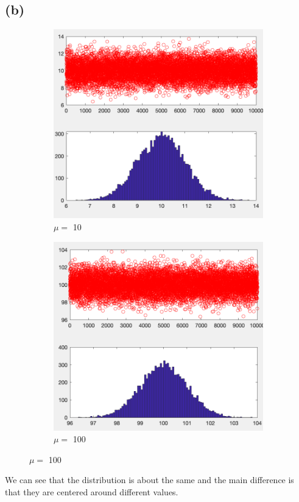 \documentclass{article}
\begin{document}
\subsection{(b)}
\begin{figure}[H]
    \begin{subfigure}[h]{0.4\linewidth}
        \includegraphics[width=\linewidth]{./imgs/q1b_10.png}
        \caption{\( \mu = \) 10}
    \end{subfigure}
    \hfill
    \begin{subfigure}[h]{0.4\linewidth}
        \includegraphics[width=\linewidth]{./imgs/q1b_100.png}
        \caption{\( \mu = \) 100}
    \end{subfigure}
\end{figure}
We can see that the distribution is about the same and the main difference is that they are centered
around different values.
\end{document}
